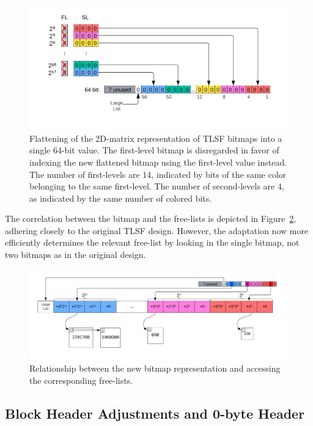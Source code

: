\begin{figure}[H]
    \centering
    \includegraphics[width=1\textwidth]{figures/bitmap_flattening.png}
    \caption{Flattening of the 2D-matrix representation of TLSF bitmaps into a single 64-bit value. The first-level bitmap is disregarded in favor of indexing the new flattened bitmap using the first-level value instead. The number of first-levels are 14, indicated by bits of the same color belonging to the same first-level. The number of second-levels are 4, as indicated by the same number of colored bits.}
    \label{fig:bitmap_flattening}
\end{figure}

The correlation between the bitmap and the free-lists is depicted in Figure~\ref{fig:bitmap_relationship}, adhering closely to the original TLSF design. However, the adaptation now more efficiently determines the relevant free-list by looking in the single bitmap, not two bitmaps as in the original design.

\begin{figure}[H]
    \centering
    \includegraphics[width=1\textwidth]{figures/bitmap_relationship.png}
    \caption{Relationship between the new bitmap representation and accessing the corresponding free-lists.}
    \label{fig:bitmap_relationship}
\end{figure}

\subsection{Block Header Adjustments and 0-byte Header}
\label{sec:adaptations_impl:0-byte-header}

